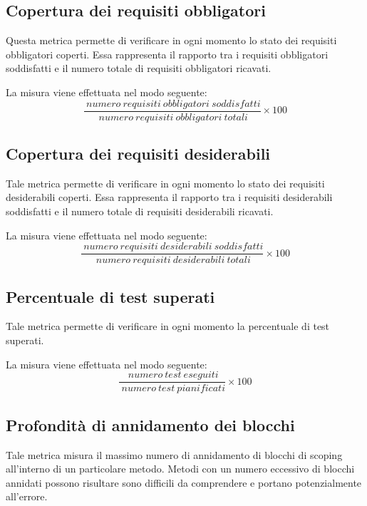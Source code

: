 \subsection{Copertura dei requisiti obbligatori}
Questa metrica permette di verificare in ogni momento lo stato dei requisiti obbligatori coperti. Essa rappresenta il rapporto tra i requisiti obbligatori soddisfatti e il numero totale di requisiti obbligatori ricavati.

La misura viene effettuata nel modo seguente:
\begin{equation}
	\frac{~numero~requisiti~obbligatori~soddisfatti}{~numero~requisiti~obbligatori~totali}\times{100}
\end{equation}



\subsection{Copertura dei requisiti desiderabili}
Tale metrica permette di verificare in ogni momento lo stato dei requisiti desiderabili coperti. Essa rappresenta il rapporto tra i requisiti desiderabili soddisfatti e il numero totale di requisiti desiderabili ricavati.

La misura viene effettuata nel modo seguente:
\begin{equation}
	\frac{~numero~requisiti~desiderabili~soddisfatti}{~numero~requisiti~desiderabili~totali}\times{100}
\end{equation}



\subsection{Percentuale di test superati}
Tale metrica permette di verificare in ogni momento la percentuale di test superati.

La misura viene effettuata nel modo seguente:
\begin{equation}
	\frac{~numero~test~eseguiti}{~numero~test~pianificati}\times{100}
\end{equation}



\subsection{Profondità di annidamento dei blocchi}
Tale metrica misura il massimo numero di annidamento di blocchi di scoping all'interno di un particolare metodo. Metodi con un numero eccessivo di blocchi annidati possono risultare sono difficili da comprendere e portano potenzialmente all'errore.




